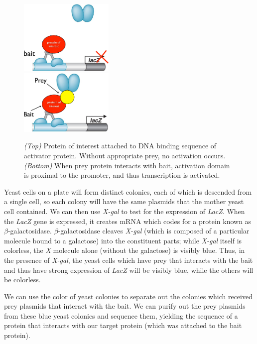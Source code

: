 \documentclass{article}
\begin{document}
\begin{figure}[h!]
    \begin{center}
        \includegraphics[width=0.40\textwidth]{images/bait.png}\\
        \vspace*{2em}
        \includegraphics[width=0.40\textwidth]{images/bait-and-prey.png}
    \end{center}
    \caption{
        \emph{(Top)} Protein of interest attached to DNA binding sequence of activator protein.
        Without appropriate prey, no activation occurs.\\
        \emph{(Bottom)} When prey protein interacts with bait, activation domain is proximal to the
        promoter, and thus transcription is activated.
    }
\end{figure}

Yeast cells on a plate will form distinct colonies, each of which is descended from a single cell,
so each colony will have the same plasmids that the mother yeast cell contained. We can then use
\emph{X-gal} to test for the expression of \emph{LacZ}. When the \emph{LacZ} gene is expressed, it
creates mRNA which codes for a protein known as $\beta$-galactosidase. $\beta$-galactosidase cleaves
\emph{X-gal} (which is composed of a particular molecule bound to a galactose) into the constituent
parts; while \emph{X-gal} itself is colorless, the \emph{X} molecule alone (without the galactose)
is visibly blue. Thus, in the presence of \emph{X-gal}, the yeast cells which have prey that
interacts with the bait and thus have strong expression of \emph{LacZ} will be visibly blue, while
the others will be colorless.

We can use the color of yeast colonies to separate out the colonies which received prey plasmids
that interact with the bait. We can purify out the prey plasmids from these blue yeast colonies and
sequence them, yielding the sequence of a protein that interacts with our target protein (which was
attached to the bait protein).
\end{document}
